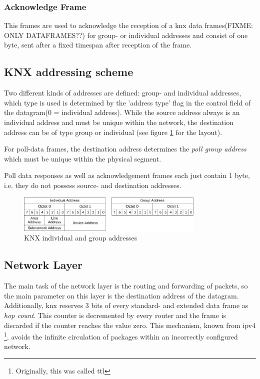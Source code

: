 \subsubsection{Acknowledge Frame}

This frames are used to acknowledge the reception of a knx data frames(FIXME: ONLY DATAFRAMES??) for group- or individual addresses and consist
of one byte, sent after a fixed timespan after reception of the frame.

\subsection{KNX addressing scheme}

Two different kinds of addresses are defined: group- and individual addresses, which type is used is determined by the 'address type' flag in the
control field of the datagram(0 = individual address). While the source address always is an individual address and must be unique
within the network, the destination address can be of type group or individual (see figure \ref{fig:knxAddr} for the layout).

For poll-data frames, the destination address determines the \textit{poll group address} which must be unique within the physical segment.

Poll data responses as well as acknowledgement frames each just contain 1 byte, i.e. they do not possess source- and destination addresses.

\begin{figure}
 \centering
    \includegraphics[width=0.8\textwidth]{figures/addresses}
 \caption{KNX individual and group addresses} 
\label{fig:knxAddr}
\end{figure}


\subsection{Network Layer}

The main task of the network layer is the routing and forwarding of packets, so the main parameter on this layer is the destination address of the
datagram. Additionally, \gls{knx} reserves 3 bits of every standard- and extended data frame as
\textit{hop count}. This counter is decremented by every router and the frame is discarded if the counter reaches the value zero. This mechanism, known from
\gls{ipv4} \cite{rfc791} \footnote{Originally, this was called \gls{ttl}}, avoids the infinite circulation of packages within an incorrectly configured network.

